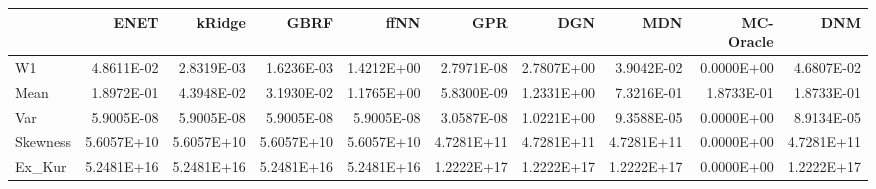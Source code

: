 \begin{tabular}{lrrrrrrrrr}
\toprule
{} &       ENET &     kRidge &       GBRF &       ffNN &        GPR &        DGN &        MDN &  MC-Oracle &        DNM \\
\midrule
W1       & 4.8611E-02 & 2.8319E-03 & 1.6236E-03 & 1.4212E+00 & 2.7971E-08 & 2.7807E+00 & 3.9042E-02 & 0.0000E+00 & 4.6807E-02 \\
Mean     & 1.8972E-01 & 4.3948E-02 & 3.1930E-02 & 1.1765E+00 & 5.8300E-09 & 1.2331E+00 & 7.3216E-01 & 1.8733E-01 & 1.8733E-01 \\
Var      & 5.9005E-08 & 5.9005E-08 & 5.9005E-08 & 5.9005E-08 & 3.0587E-08 & 1.0221E+00 & 9.3588E-05 & 0.0000E+00 & 8.9134E-05 \\
Skewness & 5.6057E+10 & 5.6057E+10 & 5.6057E+10 & 5.6057E+10 & 4.7281E+11 & 4.7281E+11 & 4.7281E+11 & 0.0000E+00 & 4.7281E+11 \\
Ex\_Kur   & 5.2481E+16 & 5.2481E+16 & 5.2481E+16 & 5.2481E+16 & 1.2222E+17 & 1.2222E+17 & 1.2222E+17 & 0.0000E+00 & 1.2222E+17 \\
\bottomrule
\end{tabular}
